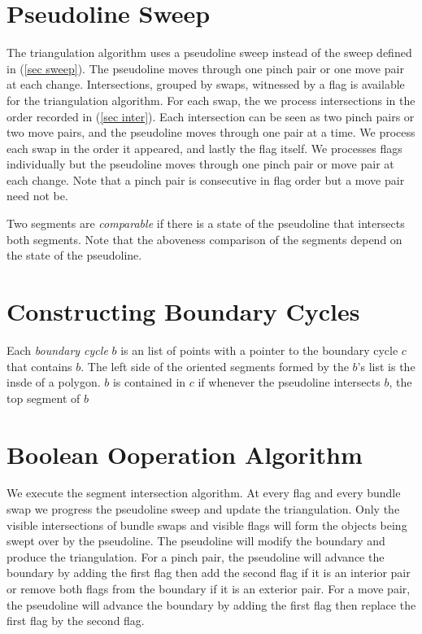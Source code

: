 \documentclass[11pt]{article}
\begin{document}
\section{Pseudoline Sweep} \label{sec pseudo}
The triangulation algorithm uses a pseudoline sweep instead of the sweep defined in (\ref{sec sweep}).
The pseudoline moves through one pinch pair or one move pair at each change.
Intersections, grouped by swaps, witnessed by a flag is available for the triangulation algorithm.
For each swap, the we process intersections in the order recorded in (\ref{sec inter}).
Each intersection can be seen as two pinch pairs or two move pairs, and the pseudoline moves through one pair at a time.
We process each swap in the order it appeared, and lastly the flag itself.
We processes flags individually but the pseudoline moves through one pinch pair or move pair at each change.
Note that a pinch pair is consecutive in flag order but a move pair need not be.

Two segments are \textit{comparable} if there is a state of the pseudoline that intersects both segments.
Note that the aboveness comparison of the segments depend on the state of the pseudoline.

\section{Constructing Boundary Cycles} \label{sec bcycle}
Each \textit{boundary cycle} $b$ is an list of points with a pointer to the boundary cycle $c$ that contains $b$.
The left side of the oriented segments formed by the $b$'s list is the insde of a polygon.
$b$ is contained in $c$ if whenever the pseudoline intersects $b$, the top segment of $b$ 


\section{Boolean Ooperation Algorithm}
We execute the segment intersection algorithm.
At every flag and every bundle swap we progress the pseudoline sweep and update the triangulation.
Only the visible intersections of bundle swaps and visible flags will form the objects being swept over by the pseudoline.
The pseudoline will modify the boundary and produce the triangulation.
For a pinch pair, the pseudoline will advance the boundary by adding the first flag then add the second flag if it is an interior pair or remove both flags from the boundary if it is an exterior pair.
For a move pair, the pseudoline will advance the boundary by adding the first flag then replace the first flag by the second flag.
\end{document}
